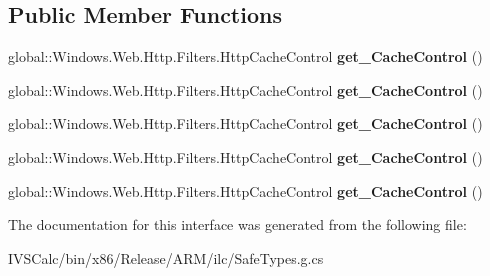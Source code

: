\subsection*{Public Member Functions}
\begin{DoxyCompactItemize}
\item 
\mbox{\label{interface_windows_1_1_web_1_1_http_1_1_filters_1_1_i_http_base_protocol_filter_a495f2b1fd170e059716b4b681db03ce1}} 
global\+::\+Windows.\+Web.\+Http.\+Filters.\+Http\+Cache\+Control {\bfseries get\+\_\+\+Cache\+Control} ()
\item 
\mbox{\label{interface_windows_1_1_web_1_1_http_1_1_filters_1_1_i_http_base_protocol_filter_a495f2b1fd170e059716b4b681db03ce1}} 
global\+::\+Windows.\+Web.\+Http.\+Filters.\+Http\+Cache\+Control {\bfseries get\+\_\+\+Cache\+Control} ()
\item 
\mbox{\label{interface_windows_1_1_web_1_1_http_1_1_filters_1_1_i_http_base_protocol_filter_a495f2b1fd170e059716b4b681db03ce1}} 
global\+::\+Windows.\+Web.\+Http.\+Filters.\+Http\+Cache\+Control {\bfseries get\+\_\+\+Cache\+Control} ()
\item 
\mbox{\label{interface_windows_1_1_web_1_1_http_1_1_filters_1_1_i_http_base_protocol_filter_a495f2b1fd170e059716b4b681db03ce1}} 
global\+::\+Windows.\+Web.\+Http.\+Filters.\+Http\+Cache\+Control {\bfseries get\+\_\+\+Cache\+Control} ()
\item 
\mbox{\label{interface_windows_1_1_web_1_1_http_1_1_filters_1_1_i_http_base_protocol_filter_a495f2b1fd170e059716b4b681db03ce1}} 
global\+::\+Windows.\+Web.\+Http.\+Filters.\+Http\+Cache\+Control {\bfseries get\+\_\+\+Cache\+Control} ()
\end{DoxyCompactItemize}


The documentation for this interface was generated from the following file\+:\begin{DoxyCompactItemize}
\item 
I\+V\+S\+Calc/bin/x86/\+Release/\+A\+R\+M/ilc/Safe\+Types.\+g.\+cs\end{DoxyCompactItemize}
